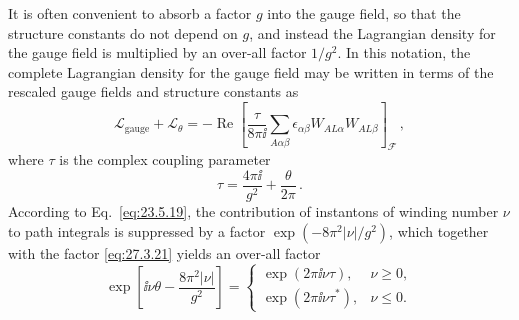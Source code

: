 It is often convenient to absorb a factor \(g\) into the gauge field, so
that the structure constants do not depend on \(g\), and instead the
Lagrangian density for the gauge field is multiplied by an over-all factor
\(1/g^2\). In this notation, the complete Lagrangian density for the gauge
field may be written in terms of the rescaled gauge fields and structure
constants as
\begin{equation}
  \mathcal{L}_{\mathrm{gauge}}+\mathcal{L}_\theta
  =-\operatorname{Re}\left[
    \frac{\tau}{8\pi \ii}
    \sum_{A\alpha\beta}
    \epsilon_{\alpha\beta}W_{AL\alpha}W_{AL\beta}
  \right]_{\mathcal{F}}\,,
  \tag{27.3.22}\label{eq:27.3.22}
\end{equation}
where \(\tau\) is the complex coupling parameter
\begin{equation}
  \tau=\frac{4\pi \ii}{g^2}+\frac{\theta}{2\pi}\,.
  \tag{27.3.23}\label{eq:27.3.23}
\end{equation}
According to Eq.~\eqref{eq:23.5.19}, the contribution of instantons of
winding number \(\nu\) to path integrals is suppressed by a factor
\(\exp(-8\pi^2|\nu|/g^2)\), which together with the factor
\eqref{eq:27.3.21} yields an over-all factor
\begin{equation}
  \exp\left[
    \ii\nu\theta-\frac{8\pi^2|\nu|}{g^2}
  \right]
  =
  \begin{cases}
    \exp(2\pi \ii\nu\tau), & \nu\geq 0,\\
    \exp(2\pi \ii\nu\tau^*), & \nu\leq 0.
  \end{cases}
  \tag{27.3.24}\label{eq:27.3.24}
\end{equation}
